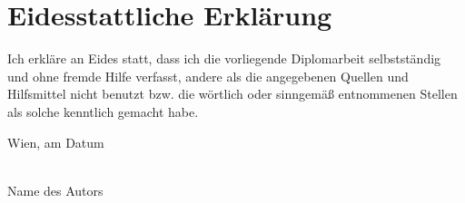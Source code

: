 \documentclass[a4paper,11pt,bibliography=totoc,listof=totoc,headinclude=true,cleardoublepage=empty,oneside]{NumPDEsThesis}
\begin{document}
\chapter*{Eidesstattliche Erkl\"arung}
\thispagestyle{empty}

\vspace*{2cm}

Ich erkl\"are an Eides statt, dass ich die vorliegende Diplomarbeit selbstst\"andig und ohne fremde Hilfe verfasst, andere als die angegebenen Quellen und Hilfsmittel nicht benutzt bzw. die w\"ortlich oder sinngem\"a{\ss} entnommenen Stellen als solche kenntlich gemacht habe.

\vspace*{3cm}

\noindent
Wien, am {\color{change}Datum} %
%
\hfill
%
\begin{minipage}[t]{5cm}
  \centering
  \underline{\hspace*{5cm}}\\
  \small\color{change}Name des Autors
\end{minipage}

\cleardoublepage



\tableofcontents

\cleardoublepage
{}






\printbibliography
\end{document}
